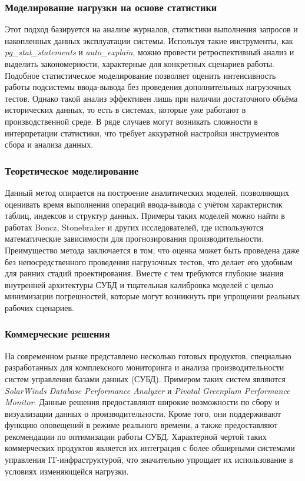 \subsubsection{Моделирование нагрузки на основе статистики}
Этот подход базируется на анализе журналов, статистики выполнения запросов и накопленных данных эксплуатации системы. 
Используя такие инструменты, как \textit{pg\_stat\_statements} и \textit{auto\_explain}, можно провести ретроспективный анализ 
и выделить закономерности, характерные для конкретных сценариев работы. Подобное статистическое моделирование позволяет оценить 
интенсивность работы подсистемы ввода-вывода без проведения дополнительных нагрузочных тестов. Однако такой анализ эффективен 
лишь при наличии достаточного объёма исторических данных, то есть в системах, которые уже работают в производственной среде. 
В ряде случаев могут возникать сложности в интерпретации статистики, что требует аккуратной настройки инструментов сбора и анализа данных.

\subsubsection{Теоретическое моделирование}
Данный метод опирается на построение аналитических моделей, позволяющих оценивать время выполнения операций ввода-вывода с учётом характеристик таблиц, 
индексов и структур данных. Примеры таких моделей можно найти в работах Boncz, Stonebraker и других исследователей, 
где используются математические зависимости для прогнозирования производительности. Преимущество метода заключается в том, 
что оценка может быть проведена даже без непосредственного проведения нагрузочных тестов, что делает его удобным для ранних 
стадий проектирования. Вместе с тем требуются глубокие знания внутренней архитектуры СУБД и тщательная калибровка моделей с 
целью минимизации погрешностей, которые могут возникнуть при упрощении реальных рабочих сценариев.

\subsubsection{Коммерческие решения}
На современном рынке представлено несколько готовых продуктов, специально разработанных для комплексного мониторинга 
и анализа производительности систем управления базами данных (СУБД). Примером таких систем являются 
\textit{SolarWinds Database Performance Analyzer} и \textit{Pivotal Greenplum Performance Monitor}. 
Данные решения предоставляют широкие возможности по сбору и визуализации данных о производительности. Кроме того, 
они поддерживают функцию оповещений в режиме реального времени, а также предоставляют рекомендации по оптимизации работы СУБД. 
Характерной чертой таких коммерческих продуктов является их интеграция с более обширными системами управления IT-инфраструктурой, 
что значительно упрощает их использование в условиях изменяющейся нагрузки.

